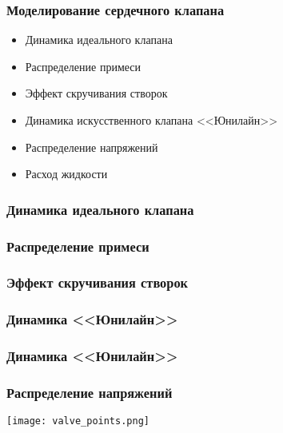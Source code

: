 \documentclass[14pt]{beamer}
\begin{document}
\begin{frame}
\frametitle{Моделирование сердечного клапана}
    \begin{itemize}
        \item[\MVRightarrow] Динамика идеального клапана
        \item[\MVRightarrow] Распределение примеси
        \item[\MVRightarrow] Эффект скручивания створок
        \item[\MVRightarrow] Динамика искусственного клапана <<Юнилайн>>
        \item[\MVRightarrow] Распределение напряжений
        \item[\MVRightarrow] Расход жидкости
    \end{itemize}
\end{frame}


\begin{frame}
\frametitle{Динамика идеального клапана}
\end{frame}

\begin{frame}
\frametitle{Распределение примеси}
\end{frame}

\begin{frame}
\frametitle{Эффект скручивания створок}
\end{frame}

\begin{frame}
\frametitle{Динамика <<Юнилайн>>}
\end{frame}

\begin{frame}
\frametitle{Динамика <<Юнилайн>>}
\end{frame}

\begin{frame}
\frametitle{Распределение напряжений}
    \begin{center}
        \texttt{[image: valve\_points.png]}
    \end{center}
\end{frame}
\end{document}
